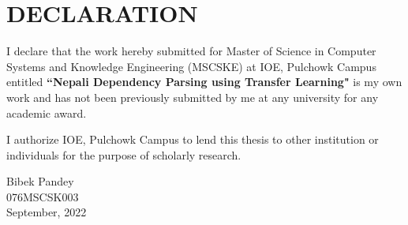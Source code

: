 \chapter*{DECLARATION}
I declare that the work hereby submitted for Master of Science in Computer
Systems and Knowledge  Engineering (MSCSKE) at IOE, Pulchowk Campus entitled
\textbf{``Nepali Dependency Parsing using Transfer Learning"} is my own work and has not been previously submitted by me at any
    university for any academic award.\par I authorize IOE, Pulchowk Campus to
    lend this thesis to other institution or individuals for the purpose of
    scholarly research.\par
\vspace{1.5cm}

Bibek Pandey\\
076MSCSK003 \\
September, 2022\\
\newpage
